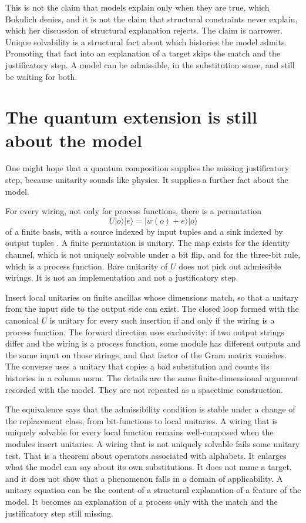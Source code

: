 \documentclass[12pt]{article}
\begin{document}
This is not the claim that models explain only when they are true, which Bokulich denies, and it is not the claim that structural constraints never explain, which her discussion of structural explanation rejects. The claim is narrower. Unique solvability is a structural fact about which histories the model admits. Promoting that fact into an explanation of a target skips the match and the justificatory step. A model can be admissible, in the substitution sense, and still be waiting for both.

\section{The quantum extension is still about the model}
\label{sec:lift}

One might hope that a quantum composition supplies the missing justificatory step, because unitarity sounds like physics. It supplies a further fact about the model.

For every wiring, not only for process functions, there is a permutation
\[
U\lvert o\rangle\lvert e\rangle = \lvert w(o)+e\rangle\lvert o\rangle
\]
of a finite basis, with a source indexed by input tuples and a sink indexed by output tuples \citep{baumeler2019}. A finite permutation is unitary. The map exists for the identity channel, which is not uniquely solvable under a bit flip, and for the three-bit rule, which is a process function. Bare unitarity of \(U\) does not pick out admissible wirings. It is not an implementation and not a justificatory step.

Insert local unitaries on finite ancillas whose dimensions match, so that a unitary from the input side to the output side can exist. The closed loop formed with the canonical \(U\) is unitary for every such insertion if and only if the wiring is a process function. The forward direction uses exclusivity: if two output strings differ and the wiring is a process function, some module has different outputs and the same input on those strings, and that factor of the Gram matrix vanishes. The converse uses a unitary that copies a bad substitution and counts its histories in a column norm. The details are the same finite-dimensional argument recorded with the model. They are not repeated as a spacetime construction.

The equivalence says that the admissibility condition is stable under a change of the replacement class, from bit-functions to local unitaries. A wiring that is uniquely solvable for every local function remains well-composed when the modules insert unitaries. A wiring that is not uniquely solvable fails some unitary test. That is a theorem about operators associated with alphabets. It enlarges what the model can say about its own substitutions. It does not name a target, and it does not show that a phenomenon falls in a domain of applicability. A unitary equation can be the content of a structural explanation of a feature of the model. It becomes an explanation of a process only with the match and the justificatory step still missing.
\end{document}
